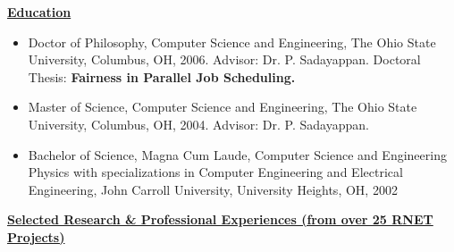  {\bf{\underline{Education}}}
 
 \begin{itemize}
 	\setlength{\itemsep}{0.2pt}
 	\item Doctor of Philosophy, Computer Science and Engineering, The
 	Ohio State University, Columbus, OH, 2006. Advisor:
 	Dr. P. Sadayappan. Doctoral Thesis: \textbf{Fairness in Parallel Job
 		Scheduling.}
 	\item Master of Science, Computer Science and Engineering, The Ohio
 	State University, Columbus, OH, 2004. Advisor: Dr. P. Sadayappan.
 	\item Bachelor of Science, Magna Cum Laude, Computer Science and
 	Engineering Physics with specializations in Computer Engineering and
 	Electrical Engineering, John Carroll University, University Heights,
 	OH, 2002
 \end{itemize}
 
 {\bf {\underline{Selected Research \& Professional Experiences (from over 25 RNET Projects)}}}
 
